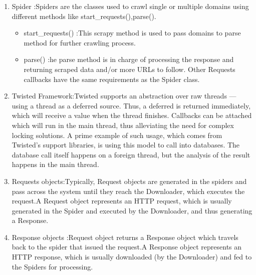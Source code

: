 \begin{enumerate}
   \item Spider :Spiders are the classes used to crawl single or multiple domains using different methods like start\_requests(),parse().
   \begin{itemize}
     \item start\_requests() :This scrapy method is used to pass domains to parse method for further crawling process.
     \item parse() :he parse method is in charge of processing the response and returning scraped data and/or more URLs to follow. Other Requests callbacks have the same requirements as the Spider class.
   \end{itemize}
      \item Twisted Framework:Twisted supports an abstraction over raw threads — using a thread as a deferred source. Thus, a deferred is returned immediately, which will receive a value when the thread finishes. Callbacks can be attached which will run in the main thread, thus alleviating the need for complex locking solutions. A prime example of such usage, which comes from Twisted's support libraries, is using this model to call into databases. The database call itself happens on a foreign thread, but the analysis of the result happens in the main thread.
      \item Requests objects:Typically, Request objects are generated in the spiders and pass across the system until they reach the Downloader, which executes the request.A Request object represents an HTTP request, which is usually generated in the Spider and executed by the Downloader, and thus generating a Response.
	\item Response objects :Request object returns a Response object which travels back to the spider that issued the request.A Response object represents an HTTP response, which is usually downloaded (by the Downloader) and fed to the Spiders for processing.

\end{enumerate}
